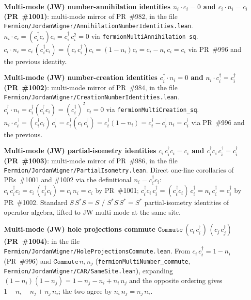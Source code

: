 \documentclass[a4paper,11pt]{article}
\begin{document}
\textbf{Multi-mode (JW) number-annihilation identities
$n_i\cdot c_i = 0$ and $c_i\cdot n_i = c_i$ (PR~\#1001)}:
multi-mode mirror of PR~\#982, in the file
\texttt{Fermion/JordanWigner/AnnihilationNumberIdentities.lean}.
$n_i\cdot c_i = (c_i^\dagger c_i)c_i = c_i^\dagger\,c_i^2 = 0$
via \texttt{fermionMultiAnnihilation\_sq}. $c_i\cdot n_i =
c_i\,(c_i^\dagger c_i) = (c_i\,c_i^\dagger)c_i = (1-n_i)c_i =
c_i - n_i\,c_i = c_i$ via PR~\#996 and the previous identity.

\textbf{Multi-mode (JW) number-creation identities
$c_i^\dagger\cdot n_i = 0$ and $n_i\cdot c_i^\dagger =
c_i^\dagger$ (PR~\#1002)}: multi-mode mirror of PR~\#984, in
the file
\texttt{Fermion/JordanWigner/CreationNumberIdentities.lean}.
$c_i^\dagger\cdot n_i = c_i^\dagger(c_i^\dagger c_i) =
(c_i^\dagger)^2\,c_i = 0$ via
\texttt{fermionMultiCreation\_sq}.
$n_i\cdot c_i^\dagger = (c_i^\dagger c_i)\,c_i^\dagger =
c_i^\dagger(c_i\,c_i^\dagger) = c_i^\dagger(1-n_i) =
c_i^\dagger - c_i^\dagger\,n_i = c_i^\dagger$ via PR~\#996 and
the previous.

\textbf{Multi-mode (JW) partial-isometry identities
$c_i\,c_i^\dagger c_i = c_i$ and $c_i^\dagger c_i\,c_i^\dagger
= c_i^\dagger$ (PR~\#1003)}: multi-mode mirror of PR~\#986, in
the file \texttt{Fermion/JordanWigner/PartialIsometry.lean}.
Direct one-line corollaries of PRs~\#1001 and \#1002 via the
definitional $n_i = c_i^\dagger c_i$:
$c_i\,c_i^\dagger c_i = c_i\,(c_i^\dagger c_i) = c_i\,n_i = c_i$
by PR~\#1001;
$c_i^\dagger c_i\,c_i^\dagger = (c_i^\dagger c_i)\,c_i^\dagger
= n_i\,c_i^\dagger = c_i^\dagger$ by PR~\#1002. Standard
$S\,S^*S = S$ / $S^*S\,S^* = S^*$ partial-isometry identities
of operator algebra, lifted to JW multi-mode at the same site.

\textbf{Multi-mode (JW) hole projections commute
$\texttt{Commute}\,(c_i\,c_i^\dagger)\,(c_j\,c_j^\dagger)$
(PR~\#1004)}: in the file
\texttt{Fermion/JordanWigner/HoleProjectionsCommute.lean}. From
$c_i\,c_i^\dagger = 1 - n_i$ (PR~\#996) and
$\texttt{Commute}\,n_i\,n_j$
(\texttt{fermionMultiNumber\_commute},
\texttt{Fermion/JordanWigner/CAR/SameSite.lean}), expanding
$(1 - n_i)(1 - n_j) = 1 - n_j - n_i + n_i\,n_j$ and the
opposite ordering gives $1 - n_i - n_j + n_j\,n_i$; the two
agree by $n_i\,n_j = n_j\,n_i$.
\end{document}

